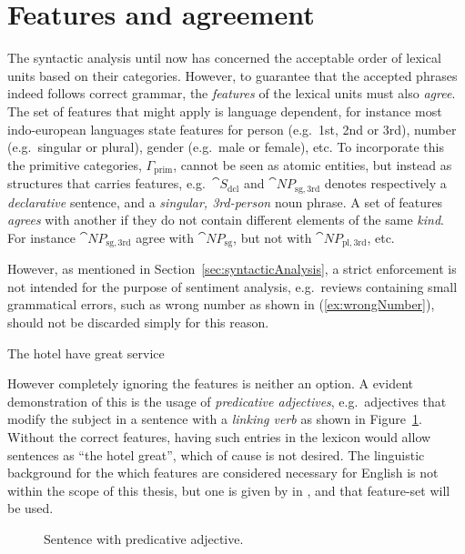\section{Features and agreement}
\label{sec:featuresAgreement}

The syntactic analysis until now has concerned the acceptable order of lexical units based on their categories. However, to guarantee that the accepted phrases indeed follows correct grammar, the \emph{features} of the lexical units must also \emph{agree}. The set of features that might apply is language dependent, for instance most indo-european languages state features for person (e.g.\ 1st, 2nd or 3rd), number (e.g.\ singular or plural), gender (e.g.\ male or female), etc. To incorporate this the primitive categories, $\Gamma_\mathrm{prim}$, cannot be seen as atomic entities, but instead as structures that carries features, e.g.\ $\cat{S_\mathrm{dcl}}$ and $\cat{NP}_\mathrm{sg,3rd}$ denotes respectively a \emph{declarative} sentence, and a \emph{singular, 3rd-person} noun phrase. A set of features \emph{agrees} with another if they do not contain different elements of the same \emph{kind}. For instance $\cat{NP}_\mathrm{sg,3rd}$ agree with $\cat{NP}_\mathrm{sg}$, but not with $\cat{NP}_\mathrm{pl,3rd}$, etc.

However, as mentioned in Section~\ref{sec:syntacticAnalysis}, a strict enforcement is not intended for the purpose of sentiment analysis, e.g.\ reviews containing small grammatical errors, such as wrong number as shown in (\ref{ex:wrongNumber}), should not be discarded simply for this reason. 

\begin{numquote}
  The hotel have great service
  \label{ex:wrongNumber}
\end{numquote}

However completely ignoring the features is neither an option. A evident demonstration of this is the usage of \emph{predicative adjectives}, e.g.\ adjectives that modify the subject in a sentence with a \emph{linking verb} as shown in Figure~\ref{fig:predicateAdj}. Without the correct features, having such entries in the lexicon would allow sentences as ``the hotel great'', which of cause is not desired. The linguistic background for the which features are considered necessary for English is not within the scope of this thesis, but one is given by \citeauthor{juliaThesis} in , and that feature-set will be used.
\begin{figure}[ht]
\center
{}
\caption{Sentence with predicative adjective.}
\label{fig:predicateAdj}
\end{figure}

